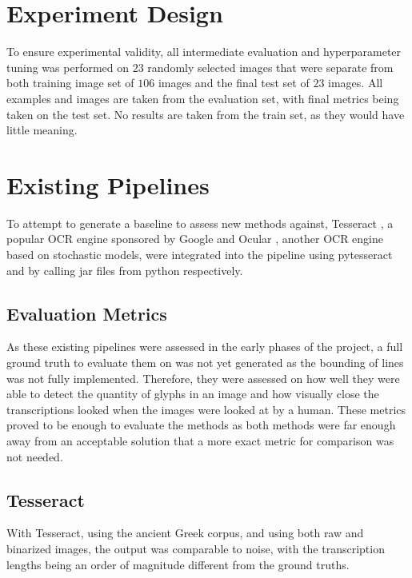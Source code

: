 \section{Experiment Design}

To ensure experimental validity, all intermediate evaluation and hyperparameter tuning was performed on $23$ randomly selected images that were separate from both training image set of $106$ images and the final test set of $23$ images. All examples and images are taken from the evaluation set, with final metrics being taken on the test set. No results are taken from the train set, as they would have little meaning.

\section{Existing Pipelines}

To attempt to generate a baseline to assess new methods against, Tesseract \cite{SmithTesseract}, a popular OCR engine sponsored by Google \cite{Vincent} and Ocular \cite{Berg-Kirkpatrick}, another OCR engine based on stochastic models, were integrated into the pipeline using pytesseract \cite{Lee} and by calling jar files from python respectively.

\subsection{Evaluation Metrics}

As these existing pipelines were assessed in the early phases of the project, a full ground truth to evaluate them on was not yet generated as the bounding of lines was not fully implemented. Therefore, they were assessed on how well they were able to detect the quantity of glyphs in an image and how visually close the transcriptions looked when the images were looked at by a human. These metrics proved to be enough to evaluate the methods as both methods were far enough away from an acceptable solution that a more exact metric for comparison was not needed.

\subsection{Tesseract}

With Tesseract, using the ancient Greek corpus, and using both raw and binarized images, the output was comparable to noise, with the transcription lengths being an order of magnitude different from the ground truths.


